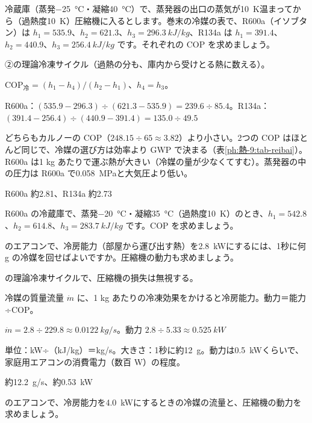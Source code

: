 \begin{reidai}[冷蔵庫の冷媒をくらべる]
\label{ph:熱-9:ex7}冷蔵庫（蒸発\qty{-25}{\celsius}・凝縮\qty{40}{\celsius}）で、蒸発器の出口の蒸気が\qty{10}{K}温まってから（過熱度\qty{10}{K}）圧縮機に入るとします。巻末の冷媒の表で、R600a（イソブタン）は $h_1=535.9$、$h_2=621.3$、$h_3=\qty{296.3}{kJ/kg}$、R134a は $h_1=391.4$、$h_2=440.9$、$h_3=\qty{256.4}{kJ/kg}$ です。それぞれの COP を求めましょう。
\par{} ②の理論冷凍サイクル（過熱の分も、庫内から受けとる熱に数える）。
\par\kangaekata $\mathrm{COP}_{\text{冷}}=(h_1-h_4)/(h_2-h_1)$、$h_4=h_3$。
\par\shiki R600a：$(535.9-296.3)\div(621.3-535.9)=239.6\div85.4$。R134a：$(391.4-256.4)\div(440.9-391.4)=135.0\div49.5$
\par{} どちらもカルノーの COP（$248.15\div65\approx3.82$）より小さい。2つの COP はほとんど同じで、冷媒の選び方は効率より GWP で決まる（表\ref{ph:熱-9:tab-reibai}）。R600a は1 kg あたりで運ぶ熱が大きい（冷媒の量が少なくてすむ）。蒸発器の中の圧力は R600a で\qty{0.058}{MPa}と大気圧より低い。
\par\kotae R600a 約2.81、R134a 約2.73
\end{reidai}
\begin{jibun}
R600a の冷蔵庫で、蒸発\qty{-20}{\celsius}・凝縮\qty{35}{\celsius}（過熱度\qty{10}{K}）のとき、$h_1=542.8$、$h_2=614.8$、$h_3=\qty{283.7}{kJ/kg}$ です。COP を求めましょう。
\end{jibun}

\begin{reidai}
\label{ph:熱-9:ex8}のエアコンで、冷房能力（部屋から運び出す熱）を\qty{2.8}{kW}にするには、1秒に何 g の冷媒を回せばよいですか。圧縮機の動力も求めましょう。
\par{} の理論冷凍サイクルで、圧縮機の損失は無視する。
\par\kangaekata 冷媒の質量流量 $\dot m$ に、1 kg あたりの冷凍効果をかけると冷房能力。動力＝能力÷COP。
\par\shiki $\dot m=2.8\div229.8\approx\qty{0.0122}{kg/s}$。動力 $2.8\div5.33\approx\qty{0.525}{kW}$
\par{} 単位：kW÷（kJ/kg）＝kg/s。大きさ：1秒に約\qty{12}{g}。動力は\qty{0.5}{kW}くらいで、家庭用エアコンの消費電力（数百 W）の程度。
\par\kotae 約\qty{12.2}{g/s}、約\qty{0.53}{kW}
\end{reidai}
\begin{jibun}
のエアコンで、冷房能力を\qty{4.0}{kW}にするときの冷媒の流量と、圧縮機の動力を求めましょう。
\end{jibun}

